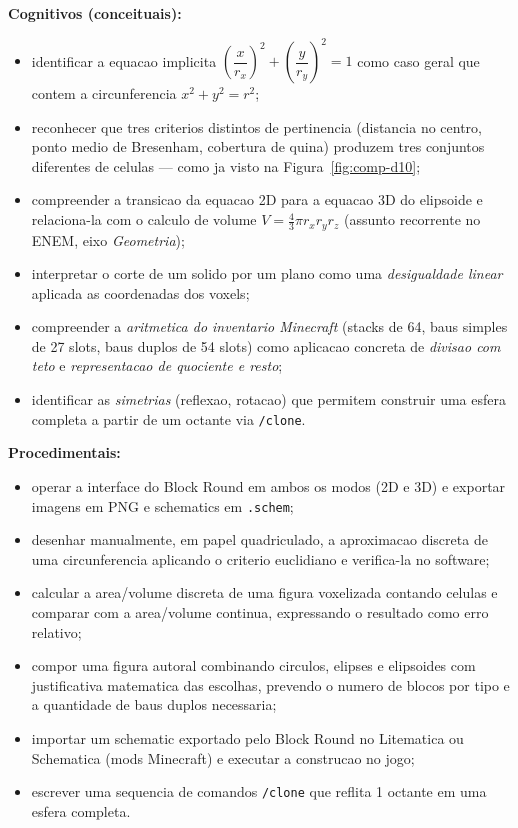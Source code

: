 \documentclass[12pt,a4paper]{scrartcl}
\newcommand{\cmd}[1]{\textcolor{earth}{\texttt{\small #1}}}
\begin{document}
\textbf{Cognitivos (conceituais):}
\begin{itemize}[leftmargin=1.3em,itemsep=0.2em,topsep=0.3em]
  \item identificar a equacao implicita $\left(\dfrac{x}{r_x}\right)^{\!2} + \left(\dfrac{y}{r_y}\right)^{\!2} = 1$ como caso geral que contem a circunferencia $x^2 + y^2 = r^2$;
  \item reconhecer que tres criterios distintos de pertinencia (distancia no centro, ponto medio de Bresenham, cobertura de quina) produzem tres conjuntos diferentes de celulas --- como ja visto na Figura~\ref{fig:comp-d10};
  \item compreender a transicao da equacao 2D para a equacao 3D do elipsoide e relaciona-la com o calculo de volume $V = \tfrac{4}{3}\pi r_x r_y r_z$ (assunto recorrente no ENEM, eixo \emph{Geometria});
  \item interpretar o corte de um solido por um plano como uma \emph{desigualdade linear} aplicada as coordenadas dos voxels;
  \item compreender a \emph{aritmetica do inventario Minecraft} (stacks de 64, baus simples de 27 slots, baus duplos de 54 slots) como aplicacao concreta de \emph{divisao com teto} e \emph{representacao de quociente e resto};
  \item identificar as \emph{simetrias} (reflexao, rotacao) que permitem construir uma esfera completa a partir de um octante via \cmd{/clone}.
\end{itemize}

\textbf{Procedimentais:}
\begin{itemize}[leftmargin=1.3em,itemsep=0.2em,topsep=0.3em]
  \item operar a interface do Block Round em ambos os modos (2D e 3D) e exportar imagens em PNG e schematics em \texttt{.schem};
  \item desenhar manualmente, em papel quadriculado, a aproximacao discreta de uma circunferencia aplicando o criterio euclidiano e verifica-la no software;
  \item calcular a area/volume discreta de uma figura voxelizada contando celulas e comparar com a area/volume continua, expressando o resultado como erro relativo;
  \item compor uma figura autoral combinando circulos, elipses e elipsoides com justificativa matematica das escolhas, prevendo o numero de blocos por tipo e a quantidade de baus duplos necessaria;
  \item importar um schematic exportado pelo Block Round no Litematica ou Schematica (mods Minecraft) e executar a construcao no jogo;
  \item escrever uma sequencia de comandos \cmd{/clone} que reflita 1 octante em uma esfera completa.
\end{itemize}
\end{document}

